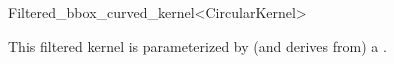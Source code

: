 \begin{ccRefClass}{Filtered_bbox_curved_kernel<CircularKernel>}

\ccDefinition



\ccParameters

This filtered kernel is parameterized by (and derives from) a . 

\end{ccRefClass}
